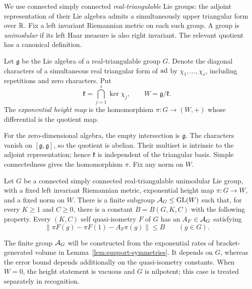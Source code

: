 We use connected simply connected \emph{real-triangulable} Lie groups: the adjoint representation of their Lie algebra admits a simultaneously upper triangular form over $\mathbb R$. Fix a left invariant Riemannian metric on each such group. A group is \emph{unimodular} if its left Haar measure is also right invariant. The relevant quotient has a canonical definition.

\begin{definition}\label{def:canonical-height}
Let $\mathfrak g$ be the Lie algebra of a real-triangulable group $G$. Denote the diagonal characters of a simultaneous real triangular form of $\operatorname{ad}$ by $\chi_1,\ldots,\chi_s$, including repetitions and zero characters. Put
\[
 \mathfrak k=\bigcap_{j=1}^s\ker\chi_j,
 \qquad W=\mathfrak g/\mathfrak k.
\]
The \emph{exponential height map} is the homomorphism $\pi:G\to(W,+)$ whose differential is the quotient map.
\end{definition}

For the zero-dimensional algebra, the empty intersection is $\mathfrak g$. The characters vanish on $[\mathfrak g,\mathfrak g]$, so the quotient is abelian. Their multiset is intrinsic to the adjoint representation; hence $\mathfrak k$ is independent of the triangular basis. Simple connectedness gives the homomorphism $\pi$. Fix any norm on $W$.

\begin{theorem}\label{thm:bounded-height}
Let $G$ be a connected simply connected real-triangulable unimodular Lie group, with a fixed left invariant Riemannian metric, exponential height map $\pi:G\to W$, and a fixed norm on $W$. There is a finite subgroup $\mathcal A_G\leq\operatorname{GL}(W)$ such that, for every $K\geq1$ and $C\geq0$, there is a constant $B=B(G,K,C)$ with the following property. Every $(K,C)$ self quasi-isometry $F$ of $G$ has an $A_F\in\mathcal A_G$ satisfying
\begin{equation}\label{eq:height-main}
 \bigl\|\pi F(g)-\pi F(1)-A_F\pi(g)\bigr\|\leq B
 \qquad(g\in G).
\end{equation}
\end{theorem}

The finite group $\mathcal A_G$ will be constructed from the exponential rates of bracket-generated volume in Lemma~\ref{lem:support-symmetries}. It depends on $G$, whereas the error bound depends additionally on the quasi-isometry constants. When $W=0$, the height statement is vacuous and $G$ is nilpotent; this case is treated separately in recognition.

